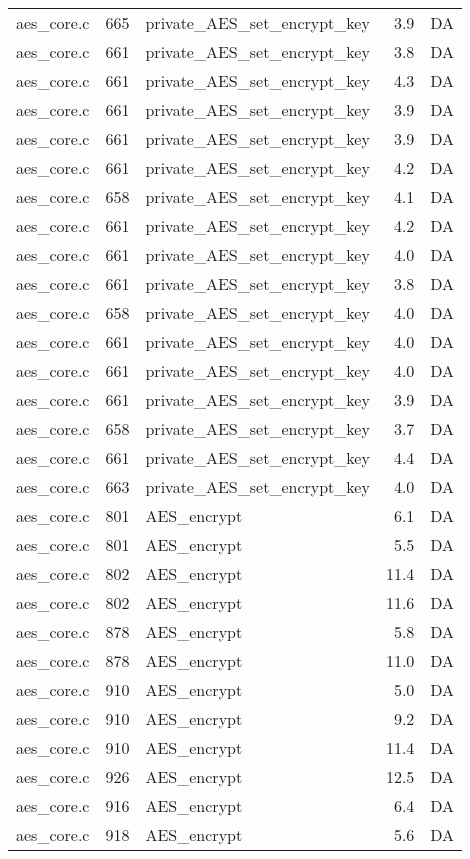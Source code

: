 \begin{table}[h!]
\begin{tabular}{lrlrr}
aes\_core.c& 665&private\_AES\_set\_encrypt\_key&3.9 &DA\\
aes\_core.c& 661&private\_AES\_set\_encrypt\_key&3.8 &DA\\
aes\_core.c& 661&private\_AES\_set\_encrypt\_key&4.3 &DA\\
aes\_core.c& 661&private\_AES\_set\_encrypt\_key&3.9 &DA\\
aes\_core.c& 661&private\_AES\_set\_encrypt\_key&3.9 &DA\\
aes\_core.c& 661&private\_AES\_set\_encrypt\_key&4.2 &DA\\
aes\_core.c& 658&private\_AES\_set\_encrypt\_key&4.1 &DA\\
aes\_core.c& 661&private\_AES\_set\_encrypt\_key&4.2 &DA\\
aes\_core.c& 661&private\_AES\_set\_encrypt\_key&4.0 &DA\\
aes\_core.c& 661&private\_AES\_set\_encrypt\_key&3.8 &DA\\
aes\_core.c& 658&private\_AES\_set\_encrypt\_key&4.0 &DA\\
aes\_core.c& 661&private\_AES\_set\_encrypt\_key&4.0 &DA\\
aes\_core.c& 661&private\_AES\_set\_encrypt\_key&4.0 &DA\\
aes\_core.c& 661&private\_AES\_set\_encrypt\_key&3.9 &DA\\
aes\_core.c& 658&private\_AES\_set\_encrypt\_key&3.7 &DA\\
aes\_core.c& 661&private\_AES\_set\_encrypt\_key&4.4 &DA\\
aes\_core.c& 663&private\_AES\_set\_encrypt\_key&4.0 &DA\\
aes\_core.c& 801&AES\_encrypt&6.1 &DA\\
aes\_core.c& 801&AES\_encrypt&5.5 &DA\\
aes\_core.c& 802&AES\_encrypt&11.4 &DA\\
aes\_core.c& 802&AES\_encrypt&11.6 &DA\\
aes\_core.c& 878&AES\_encrypt&5.8 &DA\\
aes\_core.c& 878&AES\_encrypt&11.0 &DA\\
aes\_core.c& 910&AES\_encrypt&5.0 &DA\\
aes\_core.c& 910&AES\_encrypt&9.2 &DA\\
aes\_core.c& 910&AES\_encrypt&11.4 &DA\\
aes\_core.c& 926&AES\_encrypt&12.5 &DA\\
aes\_core.c& 916&AES\_encrypt&6.4 &DA\\
aes\_core.c& 918&AES\_encrypt&5.6 &DA\\

\end{tabular}
\end{table}
